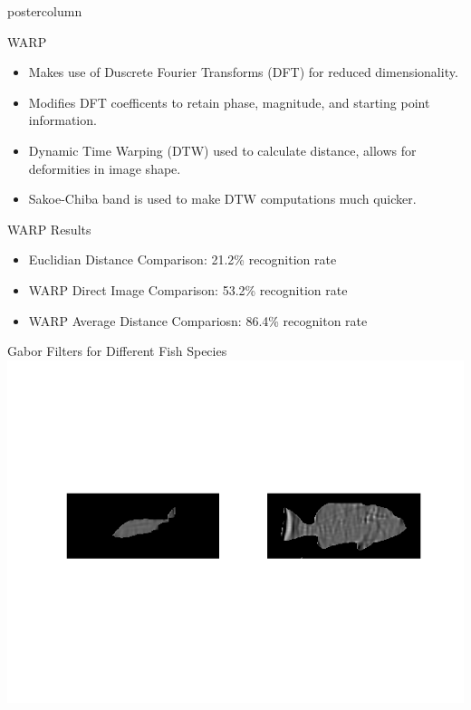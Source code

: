 \documentclass[final]{beamer}
\begin{document}
\begin{frame}
\begin{columns}
\begin{column}{.33\textwidth}
\begin{beamercolorbox}[center,wd=\textwidth]{postercolumn}
\begin{minipage}[T]{.95\textwidth}
{            \begin{block}{WARP}
	      \begin{itemize}
              \item Makes use of Duscrete Fourier Transforms (DFT) for reduced dimensionality.
	      \item Modifies DFT coefficents to retain phase, magnitude, and starting point information.
	      \item Dynamic Time Warping (DTW) used to calculate distance, allows for deformities in image shape.
	      \item Sakoe-Chiba band is used to make DTW computations much quicker.
	      \end{itemize}
            \end{block}
            \vfill
            \begin{block}{WARP Results}
              \begin{itemize}
	      \item Euclidian Distance Comparison: 21.2\% recognition rate
              \item WARP Direct Image Comparison: 53.2\% recognition rate
              \item WARP Average Distance Compariosn: 86.4\% recogniton rate
              \end{itemize}              
            \end{block}
            \vfill
            \begin{block}{Gabor Filters for Different Fish Species}
              \centering
              \includegraphics[width=.95\linewidth,scale = .6,clip=true,trim=0 100 0 100]{figures/Gabor}
            \end{block}
}
\end{minipage}
\end{beamercolorbox}
\end{column}
\end{columns}
\end{frame}
\end{document}
